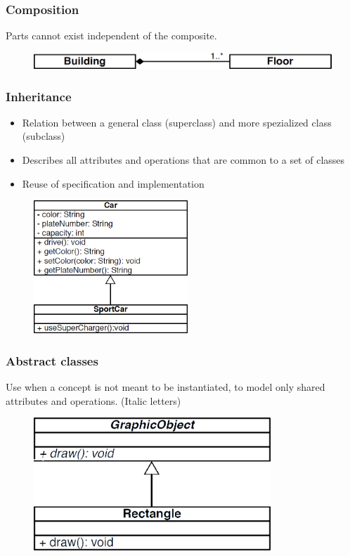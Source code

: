 \subsubsection*{Composition}
Parts cannot exist independent of the composite.
\begin{figure}[H]
	\centering
	\includegraphics[width=0.85\linewidth]{images/oop_composition}
\end{figure}
\subsubsection*{Inheritance}
\begin{itemize}
	\item Relation between a general class (superclass) and more spezialized class (subclass)
	\item Describes all attributes and operations that are common to a set of classes
	\item Reuse of specification and implementation
\end{itemize}
\begin{figure}[H]
	\centering
	\includegraphics[height=5cm,keepaspectratio]{images/oop_inheritance}
\end{figure}
\subsubsection*{Abstract classes}
Use when a concept is not meant to be instantiated, to model only shared attributes and operations. (Italic letters)
\begin{figure}[H]
	\centering
	\includegraphics[height=5cm,keepaspectratio]{images/oop_abstract_classes}
\end{figure}
